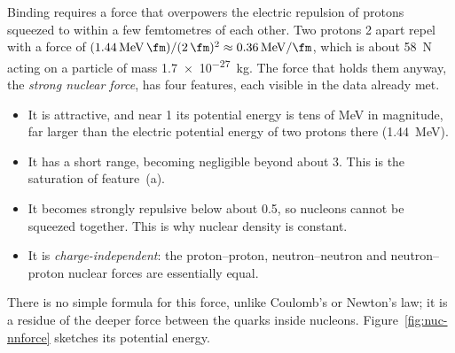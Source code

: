 Binding requires a force that overpowers the electric repulsion of protons squeezed to within a few
femtometres of each other. Two protons \SI{2}{\fm} apart repel with a force of
$(\SI{1.44}{\MeV.\fm})/(\SI{2}{\fm})^2\approx\SI{0.36}{\MeV/\fm}$, which is about \SI{58}{N} acting on a
particle of mass \SI{1.7e-27}{kg}. The force that holds them anyway, the \emph{strong nuclear force},
has four features, each visible in the data already met.
\begin{itemize}
\item It is attractive, and near \SI{1}{\fm} its potential energy is tens of \si{\MeV} in magnitude,
far larger than the electric potential energy of two protons there (\SI{1.44}{\MeV}).
\item It has a short range, becoming negligible beyond about \SI{3}{\fm}. This is the saturation of
feature~(a).
\item It becomes strongly repulsive below about \SI{0.5}{\fm}, so nucleons cannot be squeezed together.
This is why nuclear density is constant.
\item It is \emph{charge-independent}: the proton--proton, neutron--neutron and neutron--proton nuclear
forces are essentially equal.
\end{itemize}
There is no simple formula for this force, unlike Coulomb's or Newton's law; it is a residue of the
deeper force between the quarks inside nucleons. Figure~\ref{fig:nuc-nnforce} sketches its potential
energy.

\begin{figure}[htbp]
\centering
{}
\end{figure}


